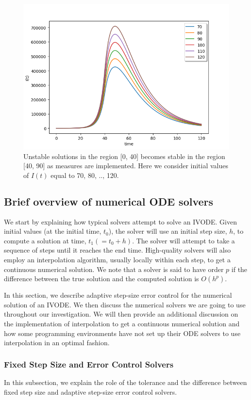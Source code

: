 \begin{figure}[H]
\centering
\includegraphics[width=0.7\linewidth]{./figures/regain_stability_after_measures}
\caption{Unstable solutions in the region [0, 40] becomes stable in the region [40, 90] as measures are implemented. Here we consider initial values of $I(t)$ equal to 70, 80, .., 120.}
\label{fig:regain_stability_after_measures}
\end{figure}

\subsection{Brief overview of numerical ODE solvers}
\label{subsection:numerical software}
We start by explaining how typical solvers attempt to solve an IVODE. Given initial values (at the initial time, $t_0$), the solver will use an initial step size, $h$, to compute a solution at time, $t_1 (= t_0 + h)$. The solver will attempt to take a sequence of steps until it reaches the end time. High-quality solvers will also employ an interpolation algorithm, usually locally within each step, to get a continuous numerical solution. We note that a solver is said to have order $p$ if the difference between the true solution and the computed solution is $O(h^p)$.

In this section, we describe adaptive step-size error control for the numerical solution of an IVODE. We then discuss the numerical solvers we are going to use throughout our investigation. We will then provide an additional discussion on the implementation of interpolation to get a continuous numerical solution and how some programming environments have not set up their ODE solvers to use interpolation in an optimal fashion.

\subsubsection{Fixed Step Size and Error Control Solvers}
\label{subsection:fixed_vs_control}
In this subsection, we explain the role of the tolerance and the difference between fixed step size and adaptive step-size error control solvers.

